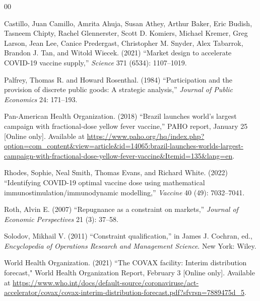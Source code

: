 \documentclass[12pt]{article}
\begin{document}

\clearpage

\begin{thebibliography}{00}

\frenchspacing

Castillo, Juan Camillo, Amrita Ahuja, Susan Athey, Arthur Baker, Eric
Budish, Tasneem Chipty, Rachel Glennerster, Scott D. Komiers, Michael
Kremer, Greg Larson, Jean Lee, Canice Predergast, Christopher
M. Snyder, Alex Tabarrok, Brandon J. Tan, and Witold Wiecek. (2021)
``Market design to accelerate COVID-19 vaccine supply,'' {\em Science}
371 (6534): 1107--1019.

Palfrey, Thomas R. and Howard Rosenthal. (1984) ``Participation and
the provision of discrete public goods: A strategic analysis,'' {\em
  Journal of Public Economics} 24: 171--193.

Pan-American Health Organization. (2018) ``Brazil launches world's
largest campaign with fractional-dose yellow fever vaccine,'' PAHO
report, January 25 [Online only]. Available at
\url{https://www.paho.org/hq/index.php?option=com_content&view=article&id=14065:brazil-launches-worlds-largest-campaign-with-fractional-dose-yellow-fever-vaccine&Itemid=135&lang=en}.

Rhodes, Sophie, Neal Smith, Thomas Evans, and Richard White. (2022)
``Identifying COVID-19 optimal vaccine dose using mathematical
immunostimulation/immunodynamic modelling,'' {\em Vaccine} 40 (49):
7032--7041.

Roth, Alvin E. (2007) ``Repugnance as a constraint on markets,'' {\em Journal of Economic Perspectives} 21 (3): 37--58.

Solodov, Mikhail V. (2011) ``Constraint qualification,'' in James
J. Cochran, ed., {\em Encyclopedia of Operations Research and
  Management Science}. New York: Wiley.

World Health Organization. (2021) ``The COVAX facility: Interim
distribution forecast," World Health Organization Report, February 3
[Online only]. Available at
\url{https://www.who.int/docs/default-source/coronaviruse/act-accelerator/covax/covax-interim-distribution-forecast.pdf?sfvrsn=7889475d_5}.



\end{thebibliography}
\end{document}
